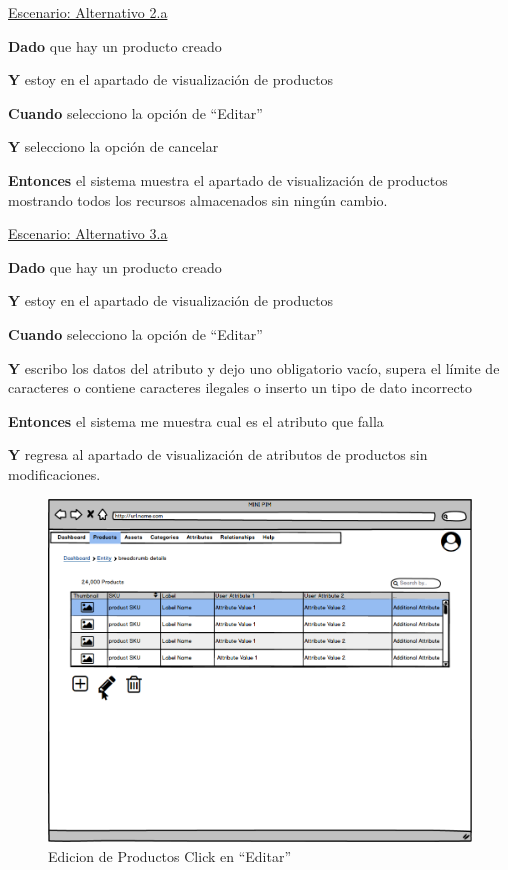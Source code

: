\underline{Escenario: Alternativo 2.a}\par
\vspace{0.15cm}
\textbf{Dado} que hay un producto creado\par
\textbf{Y} estoy en el apartado de visualización de productos\par
\textbf{Cuando} selecciono la opción de “Editar”\par
\textbf{Y} selecciono la opción de cancelar\par
\textbf{Entonces} el sistema muestra el apartado de visualización de productos mostrando todos los recursos almacenados sin ningún cambio.\par
\vspace{0.20cm}

\underline{Escenario: Alternativo 3.a}\par
\vspace{0.15cm}
\textbf{Dado} que hay un producto creado\par
\textbf{Y} estoy en el apartado de visualización de productos\par
\textbf{Cuando} selecciono la opción de “Editar”\par
\textbf{Y} escribo los datos del atributo y dejo uno obligatorio vacío, supera el límite de caracteres o contiene caracteres ilegales o inserto un tipo de dato incorrecto\par
\textbf{Entonces} el sistema me muestra cual es el atributo que falla\par
\textbf{Y} regresa al apartado de visualización de atributos de productos sin modificaciones.\par
\vspace{0.20cm}


\begin{figure}[H]
    \includegraphics[width=1\linewidth]{mockups/RF2-X Editar Producto Click en Lapiz.png}
    \caption{Edicion de Productos Click en “Editar”}
   \end{figure}
\vspace{1.0cm}


